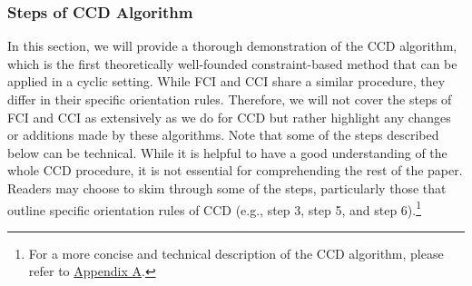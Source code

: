 \documentclass[twoside, 11pt]{article}
\newcommand{\udot}[1]{%
    \tikz[baseline=(todotted.base)]{
        \node[inner sep=1pt,outer sep=0pt] (todotted) {#1};
        \draw[dotted, thick] (todotted.south west) -- (todotted.south east);
    }%
}%
\newcommand{\starstar}{%
\begin{tikzpicture}[baseline=-3pt]
    \draw [{Rays[n=6]}-{Rays[n=6]}] (0,0) -- (0.55,0);
\end{tikzpicture}
}
\newcommand{\circstar}{%
\begin{tikzpicture}
    \draw [{Circle[open]}-{Rays[n=6]}] (0,0) -- (0.55, 0);
\end{tikzpicture}
}
\newcommand{\tailarrow}{%
\begin{tikzpicture}
    \draw [-{Straight Barb[length=2.5pt]}](0,0) -- (0.4, 0);
\end{tikzpicture}
}
\newcommand{\arrowtail}{%
\begin{tikzpicture}
    \draw [{Straight Barb[length=2.5pt]}-](0,0) -- (0.4, 0);
\end{tikzpicture}
}
\begin{document}

    

\subsubsection{Steps of CCD Algorithm}
In this section, we will provide a thorough demonstration of the CCD algorithm, which is the first theoretically well-founded constraint-based method that can be applied in a cyclic setting. While FCI and CCI share a similar procedure, they differ in their specific orientation rules. Therefore, we will not cover the steps of FCI and CCI as extensively as we do for CCD but rather highlight any changes or additions made by these algorithms. 
Note that some of the steps described below can be technical. While it is helpful to have a good understanding of the whole CCD procedure, it is not essential for comprehending the rest of the paper. Readers may choose to skim through some of the steps, particularly those that outline specific orientation rules of CCD (e.g., step 3, step 5, and step 6).\footnote{For a more concise and technical description of the CCD algorithm, please refer to \hyperref[algCCD]{Appendix A}.}
\end{document}
